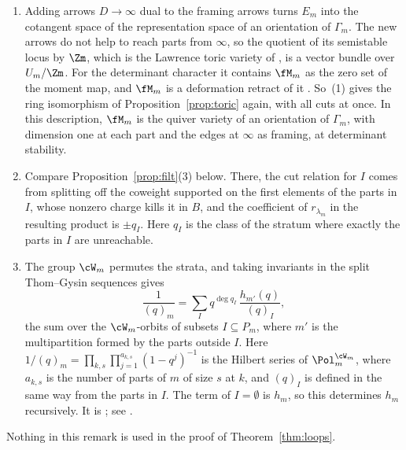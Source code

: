 \documentclass[11pt]{amsart}
\begin{document}
\begin{remark}
\begin{enumerate}[leftmargin=2em]
\item Adding arrows $D\to\infty$ dual to the framing arrows turns $E_m$ into
the cotangent space of the representation space of an orientation of
$\Gamma_m$.  The new arrows do not help to reach parts from $\infty$, so the
quotient of its semistable locus by $\Zm$, which is the Lawrence toric variety
of \cite{hauselToricHyperKahler2002}, is a vector bundle over $U_m/\Zm$.  For the
determinant character it contains $\fM_m$ as the zero set of the moment map,
and $\fM_m$ is a deformation retract of it \cite[Remark after the proof of
Thm.~1.1]{hauselToricHyperKahler2002}.  So~(1) gives the ring isomorphism of
Proposition~\ref{prop:toric} again, with all cuts at once.  In this
description, $\fM_m$ is the quiver variety of an orientation of $\Gamma_m$,
with dimension one at each part and the edges at $\infty$ as framing, at
determinant stability.
\item Compare Proposition~\ref{prop:filt}(3) below.  There, the cut relation
for $I$ comes from splitting off the coweight supported on the first elements
of the parts in $I$, whose nonzero charge kills it in $B$, and the coefficient
of $r_{\lambda_m}$ in the resulting product is $\pm q_I$.  Here $q_I$ is the
class of the stratum where exactly the parts in $I$ are unreachable.
\item The group $\cW_m$ permutes the strata, and taking invariants in the split
Thom--Gysin sequences gives
\[
 \frac1{(q)_m}=\sum_I q^{\deg q_I}\,\frac{h_{m'}(q)}{(q)_I},
\]
the sum over the $\cW_m$-orbits of subsets $I\subseteq P_m$, where $m'$ is the
multipartition formed by the parts outside $I$.  Here $1/(q)_m=\prod_{k,s}\prod_{j=1}^{a_{k,s}}(1-q^j)^{-1}$ is the
Hilbert series of $\Pol_m^{\cW_m}$, where $a_{k,s}$ is the number of parts of
$m$ of size $s$ at $k$, and $(q)_I$ is defined in the same way from the parts
in $I$.  The term of $I=\emptyset$ is $h_m$, so this determines $h_m$
recursively.  It is ; see \cite[Prop.~2.1]{nakajimaMultipartitionSpaces2026}.
\end{enumerate}
Nothing in this remark is used in the proof of Theorem~\ref{thm:loops}.
\end{remark}
\end{document}
